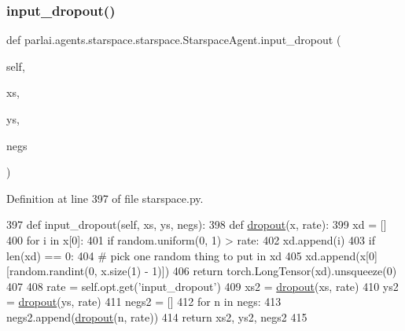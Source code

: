 \subsubsection{\texorpdfstring{input\+\_\+dropout()}{input\_dropout()}}
{\footnotesize\ttfamily def parlai.\+agents.\+starspace.\+starspace.\+Starspace\+Agent.\+input\+\_\+dropout (\begin{DoxyParamCaption}\item[{}]{self,  }\item[{}]{xs,  }\item[{}]{ys,  }\item[{}]{negs }\end{DoxyParamCaption})}



Definition at line 397 of file starspace.\+py.


\begin{DoxyCode}
397     \textcolor{keyword}{def }input\_dropout(self, xs, ys, negs):
398         \textcolor{keyword}{def }\hyperlink{namespaceseq2seq_1_1train_a6ce0f888cec4261959cc61cc80a5cfd4}{dropout}(x, rate):
399             xd = []
400             \textcolor{keywordflow}{for} i \textcolor{keywordflow}{in} x[0]:
401                 \textcolor{keywordflow}{if} random.uniform(0, 1) > rate:
402                     xd.append(i)
403             \textcolor{keywordflow}{if} len(xd) == 0:
404                 \textcolor{comment}{# pick one random thing to put in xd}
405                 xd.append(x[0][random.randint(0, x.size(1) - 1)])
406             \textcolor{keywordflow}{return} torch.LongTensor(xd).unsqueeze(0)
407 
408         rate = self.opt.get(\textcolor{stringliteral}{'input\_dropout'})
409         xs2 = \hyperlink{namespaceseq2seq_1_1train_a6ce0f888cec4261959cc61cc80a5cfd4}{dropout}(xs, rate)
410         ys2 = \hyperlink{namespaceseq2seq_1_1train_a6ce0f888cec4261959cc61cc80a5cfd4}{dropout}(ys, rate)
411         negs2 = []
412         \textcolor{keywordflow}{for} n \textcolor{keywordflow}{in} negs:
413             negs2.append(\hyperlink{namespaceseq2seq_1_1train_a6ce0f888cec4261959cc61cc80a5cfd4}{dropout}(n, rate))
414         \textcolor{keywordflow}{return} xs2, ys2, negs2
415 
\end{DoxyCode}
\mbox{\label{classparlai_1_1agents_1_1starspace_1_1starspace_1_1StarspaceAgent_a57f2fcd5e04246f3d8edf57ccdb99eab}} 
